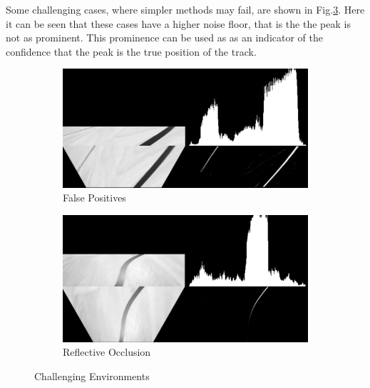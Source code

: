         Some challenging cases, where simpler methods may fail, are shown in 
        Fig.\ref{fig:ChallengingEnvironments}. Here it can be seen that these cases have a higher noise floor, 
        that is the the peak is not as prominent. This prominence can be used as as an indicator of the confidence that 
        the peak is the true position of the track. 

        \begin{figure}[H]
            \centering
            \begin{subfigure}[b]{0.45\textwidth}
                \includegraphics[width=\textwidth]{visionpipeline/vizFalsePos.png}
                \caption{False Positives}
                \label{fig:FalsePositives}
            \end{subfigure}
            \hfill
            \begin{subfigure}[b]{0.45\textwidth}
                \includegraphics[width=\textwidth]{visionpipeline/vizLightOclusion.png}
                \caption{Reflective Occlusion}
                \label{fig:ReflectOcclusion}
            \end{subfigure}
            \caption{Challenging Environments}
            \label{fig:ChallengingEnvironments}
        \end{figure}

